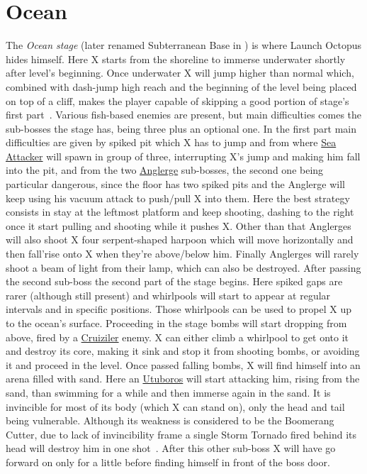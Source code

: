 \chapter{Ocean}
The \textit{Ocean stage} (later renamed Subterranean Base in \mhx) is where Launch Octopus hides himself. Here X starts from the shoreline to immerse underwater shortly after level's beginning. Once underwater X will jump higher than normal which, combined with dash-jump high reach and the beginning of the level being placed on top of a cliff, makes the player capable of skipping a good portion of stage's first part~\cite{stratwiki:Ocean}. Various fish-based enemies are present, but main difficulties comes the sub-bosses the stage has, being three plus an optional one. In the first part main difficulties are given by spiked pit which X has to jump and from where \hyperlink{enem:Sea_Attacker}{Sea Attacker} will spawn in group of three, interrupting X's jump and making him fall into the pit, and from the two \hyperlink{miniboss:Anglerge}{Anglerge} sub-bosses, the second one being particular dangerous, since the floor has two spiked pits and the Anglerge will keep using his vacuum attack to push/pull X into them. Here the best strategy consists in stay at the leftmost platform and keep shooting, dashing to the right once it start pulling and shooting while it pushes X. Other than that Anglerges will also shoot X four serpent-shaped harpoon which will move horizontally and then fall'rise onto X when they're above/below him. Finally Anglerges will rarely shoot a beam of light from their lamp, which can also be destroyed. After passing the second sub-boss the second part of the stage begins. Here spiked gaps are rarer (although still present) and whirlpools will start to appear at regular intervals and in specific positions. Those whirlpools can be used to propel X up to the ocean's surface. Proceeding in the stage bombs will start dropping from above, fired by a \hyperlink{miniboss:Cruiziler}{Cruiziler} enemy. X can either climb a whirlpool to get onto it and destroy its core, making it sink and stop it from shooting bombs, or avoiding it and proceed in the level. Once passed falling bombs, X will find himself into an arena filled with sand. Here an \hyperlink{miniboss:Utuboros}{Utuboros} will start attacking him, rising from the sand, than swimming for a while and then immerse again in the sand. It is invincible for most of its body (which X can stand on), only the head and tail being vulnerable. Although its weakness is considered to be the Boomerang Cutter, due to lack of invincibility frame a single Storm Tornado fired behind its head will destroy him in one shot~\cite{wiki:Utuboros}. After this other sub-boss X will have go forward on only for a little before finding himself in front of the boss door.

